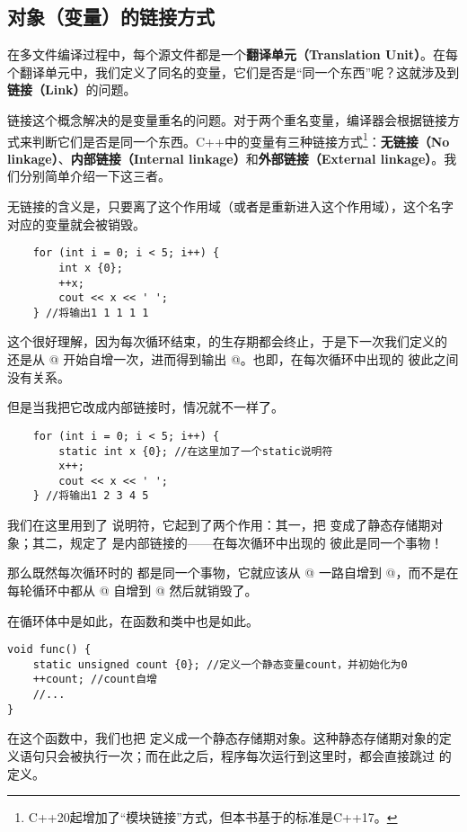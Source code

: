 \subsection*{对象（变量）的链接方式}
在多文件编译过程中，每个源文件都是一个\textbf{翻译单元（Translation Unit）}。在每个翻译单元中，我们定义了同名的变量，它们是否是``同一个东西''呢？这就涉及到\textbf{链接（Link）}的问题。\par
链接这个概念解决的是变量重名的问题。对于两个重名变量，编译器会根据链接方式来判断它们是否是同一个东西。C++中的变量有三种链接方式\footnote{C++20起增加了``模块链接''方式，但本书基于的标准是C++17。}：\textbf{无链接（No linkage）}、\textbf{内部链接（Internal linkage）}和\textbf{外部链接（External linkage）}。我们分别简单介绍一下这三者。\par
无链接的含义是，只要离了这个作用域（或者是重新进入这个作用域），这个名字对应的变量就会被销毁。
\begin{lstlisting}
    for (int i = 0; i < 5; i++) {
        int x {0};
        ++x;
        cout << x << ' ';
    } //将输出1 1 1 1 1
\end{lstlisting}
这个很好理解，因为每次循环结束，\lstinline@x@ 的生存期都会终止，于是下一次我们定义的 \lstinline@x@ 还是从 @ 开始自增一次，进而得到输出 @。也即，在每次循环中出现的 \lstinline@x@ 彼此之间没有关系。\par
但是当我把它改成内部链接时，情况就不一样了。
\begin{lstlisting}
    for (int i = 0; i < 5; i++) {
        static int x {0}; //在这里加了一个static说明符
        x++;
        cout << x << ' ';
    } //将输出1 2 3 4 5
\end{lstlisting}
我们在这里用到了 \lstinline@static@ 说明符，它起到了两个作用：其一，把 \lstinline@x@ 变成了静态存储期对象；其二，规定了 \lstinline@x@ 是内部链接的——在每次循环中出现的 \lstinline@x@ 彼此是同一个事物！\par
那么既然每次循环时的 \lstinline@x@ 都是同一个事物，它就应该从 @ 一路自增到 @，而不是在每轮循环中都从 @ 自增到 @ 然后就销毁了。\par
在循环体中是如此，在函数和类中也是如此。
\begin{lstlisting}
void func() {
    static unsigned count {0}; //定义一个静态变量count，并初始化为0
    ++count; //count自增
    //...
}
\end{lstlisting}
在这个函数中，我们也把 \lstinline@count@ 定义成一个静态存储期对象。这种静态存储期对象的定义语句只会被执行一次；而在此之后，程序每次运行到这里时，都会直接跳过 \lstinline@count@ 的定义。\par

